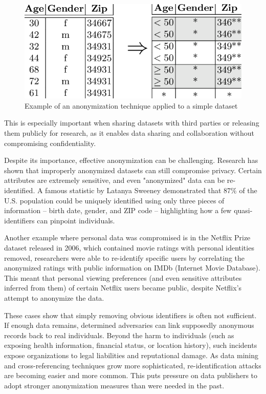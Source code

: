 \documentclass{article}
\begin{document}
\begin{figure}[h]
    \centering
    \includegraphics[width=0.65\linewidth]{images/figure1.png}
    \caption{Example of an anonymization technique applied to a simple dataset}
    \label{fig:anonymization-example}
\end{figure}

This is especially important when sharing datasets with third parties or releasing them publicly for research, as it enables data sharing and collaboration without compromising confidentiality.

Despite its importance, effective anonymization can be challenging. Research has shown that improperly anonymized datasets can still compromise privacy. Certain attributes are extremely sensitive, and even "anonymized" data can be re-identified. A famous statistic by Latanya Sweeney demonstrated that 87\% of the U.S. population could be uniquely identified using only three pieces of information – birth date, gender, and ZIP code – highlighting how a few quasi-identifiers can pinpoint individuals.

Another example where personal data was compromised is in the Netflix Prize dataset released in 2006, which contained movie ratings with personal identities removed, researchers were able to re-identify specific users by correlating the anonymized ratings with public information on IMDb (Internet Movie Database). This meant that personal viewing preferences (and even sensitive attributes inferred from them) of certain Netflix users became public, despite Netflix’s attempt to anonymize the data.

These cases show that simply removing obvious identifiers is often not sufficient. If enough data remains, determined adversaries can link supposedly anonymous records back to real individuals. Beyond the harm to individuals (such as exposing health information, financial status, or location history), such incidents expose organizations to legal liabilities and reputational damage. As data mining and cross-referencing techniques grow more sophisticated, re-identification attacks are becoming easier and more common. This puts pressure on data publishers to adopt stronger anonymization measures than were needed in the past.
\end{document}
